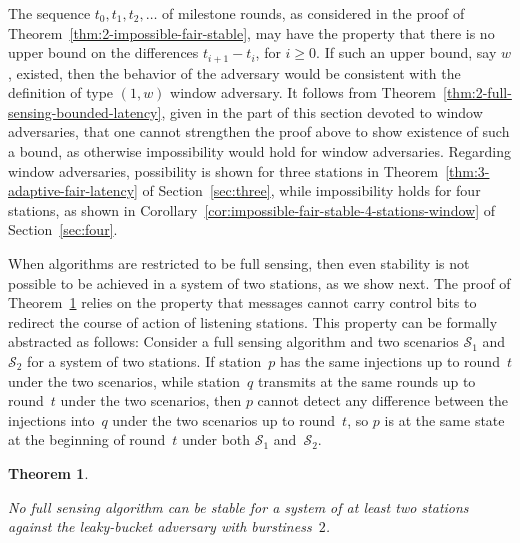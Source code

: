\documentclass[11pt]{article}
\newcommand{\cS}{\mathcal{S}}
\newtheorem{theorem}{Theorem}
\begin{document}
The sequence $t_{0}, t_{1},t_{2},\ldots$ of milestone rounds, as considered in the proof of Theorem~\ref{thm:2-impossible-fair-stable}, may have the property that there is no upper bound on the differences $t_{i+1}-t_{i}$, for $i\ge 0$.
If such an upper bound, say $w$, existed, then the behavior of the adversary would be  consistent with the definition of type $(1,w)$ window adversary.
It follows from Theorem~\ref{thm:2-full-sensing-bounded-latency}, given in the part of this section devoted to window adversaries, that one cannot strengthen the proof above to show existence of such a bound, as otherwise impossibility would hold for window adversaries.
Regarding window adversaries, possibility is shown for three stations in Theorem~\ref{thm:3-adaptive-fair-latency} of Section~\ref{sec:three}, while impossibility holds for four stations, as shown in Corollary~\ref{cor:impossible-fair-stable-4-stations-window} of Section~\ref{sec:four}.

When algorithms are restricted to be full sensing, then even stability is not possible to be achieved  in a system of two stations, as we show next.
The proof of Theorem~\ref{thm:impossible-2-full-sensing-stable} relies on the property that messages cannot carry control bits to redirect the course of action of listening stations.
This property can be formally abstracted as follows:
Consider a full sensing algorithm and two scenarios $\cS_1$ and $\cS_2$ for a system of two stations.
If  station~$p$ has the same injections up to round~$t$ under the two scenarios, while station~$q$ transmits at the same rounds up to round~$t$ under the two scenarios, then $p$ cannot detect any difference between the injections into~$q$ under the two scenarios up to round~$t$, so $p$ is at the same state at the beginning of round~$t$ under both $\cS_1$ and~$\cS_2$.



\begin{theorem}
\label{thm:impossible-2-full-sensing-stable}

No full sensing algorithm can be stable for a system of at least two stations
against the leaky-bucket adversary with burstiness~$2$.
\end{theorem}
\end{document}
